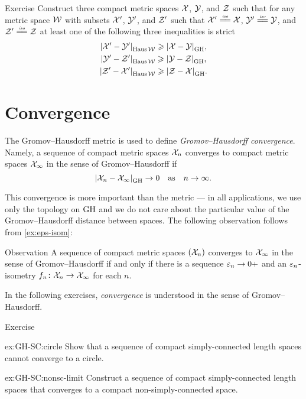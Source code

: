 \begin{thm}{Exercise}\label{ex:XYZ}
Construct three compact metric spaces $\mathcal{X}$, $\mathcal{Y}$, and $\mathcal{Z}$
such that for any metric space $\mathcal{W}$
with subsets $\mathcal{X}'$, $\mathcal{Y}'$, and $\mathcal{Z}'$ such that 
$\spc{X}'\iso\spc{X}$, $\spc{Y}'\iso\spc{Y}$, and $\spc{Z}'\iso\spc{Z}$
at least one of the following three inequalities is strict
\begin{align*}
\dist{\spc{X}'}{\spc{Y}'}{\Haus\spc{W}}&\ge \dist{\spc{X}}{\spc{Y}}{\GH},
\\
\dist{\spc{Y}'}{\spc{Z}'}{\Haus\spc{W}}&\ge\dist{\spc{Y}}{\spc{Z}}{\GH},
\\
\dist{\spc{Z}'}{\spc{X}'}{\Haus\spc{W}}&\ge\dist{\spc{Z}}{\spc{X}}{\GH}.
\end{align*}
\end{thm}

\section{Convergence}

The Gromov--Hausdorff metric is used to define \emph{Gromov--Hausdorff convergence}.
Namely, a sequence of compact metric spaces $\mathcal{X}_n$ converges to compact metric spaces $\mathcal{X}_\infty$ in the sense of Gromov--Hausdorff if 
\[\dist{\spc{X}_n}{\spc{X}_\infty}{\GH}\to 0\quad\text{as}\quad n\to\infty.\]

This convergence is more important than the metric ---
in all applications, we use only the topology on $\operatorname{\rm GH}\nolimits$
and we do not care about the particular value of the Gromov--Hausdorff distance between spaces.
The following observation follows from \ref{ex:eps-isom}:

\begin{thm}{Observation}\label{obs:GH-e-isom}
A sequence of compact metric spaces $(\mathcal{X}_n)$ converges to  $\mathcal{X}_\infty$ in the sense of Gromov--Hausdorff if and only if there is a sequence $\varepsilon_n\to0+$
and an $\varepsilon_n$-isometry $f_n\colon\mathcal{X}_n\to \mathcal{X}_\infty$ for each $n$.
\end{thm}

In the following exercises, \textit{convergence} is understood in the sense of Gromov--Hausdorff.

\begin{thm}{Exercise}\label{ex:GH-SC}
\begin{subthm}{ex:GH-SC:circle}
Show that a sequence of compact simply-connected length spaces cannot converge to a circle.
\end{subthm}

\begin{subthm}{ex:GH-SC:nonsc-limit}
Construct a sequence of compact simply-connected length spaces that converges to a compact non-simply-connected space.
\end{subthm}
\end{thm}

